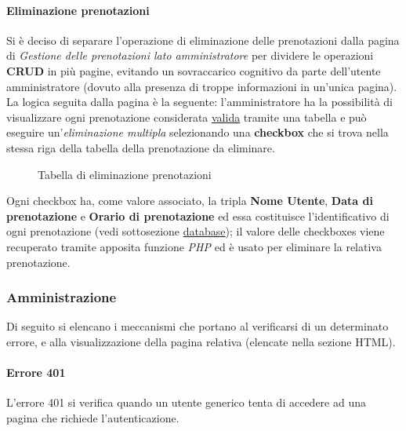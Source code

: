 \documentclass[]{article}
\begin{document}
\paragraph*{Eliminazione prenotazioni}
Si è deciso di separare l'operazione di eliminazione delle prenotazioni dalla pagina di \textit{Gestione delle prenotazioni lato amministratore} per dividere le operazioni \textbf{CRUD} in più pagine, evitando un sovraccarico cognitivo da parte dell'utente amministratore (dovuto alla presenza di troppe informazioni in un'unica pagina). \\
La logica seguita dalla pagina è la seguente: l'amministratore ha la possibilità di visualizzare ogni prenotazione considerata \hyperref[prenotazioni:valida]{\underline{valida}} tramite una tabella e può eseguire un'\textit{eliminazione multipla} selezionando una \textbf{checkbox} che si trova nella stessa riga della tabella della prenotazione da eliminare. \\

\begin{figure}[H]
	\centering
	\caption{Tabella di eliminazione prenotazioni}
\end{figure}

Ogni checkbox ha, come valore associato, la tripla \textbf{Nome Utente}, \textbf{Data di prenotazione} e \textbf{Orario di prenotazione} ed essa costituisce l'identificativo di ogni prenotazione (vedi sottosezione \hyperref[subsec:database]{\underline{database}}); il valore delle checkboxes viene recuperato tramite apposita funzione \textit{PHP} ed è usato per eliminare la relativa prenotazione.

\subsubsection{Amministrazione}
Di seguito si elencano i meccanismi che portano al verificarsi di un determinato errore, e alla visualizzazione della pagina relativa (elencate nella sezione HTML).
\paragraph*{Errore 401}
L'errore 401 si verifica quando un utente generico tenta di accedere ad una pagina che richiede l'autenticazione.
\end{document}
